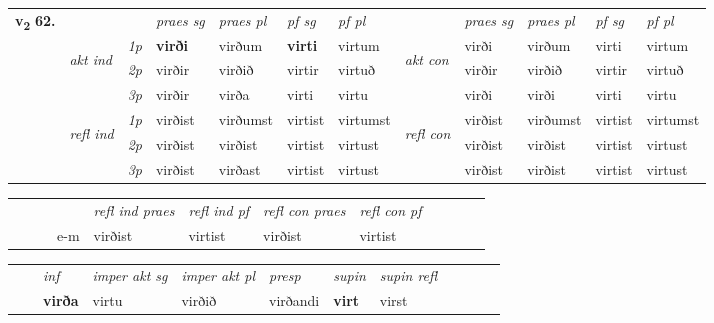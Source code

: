 \begin{tabular}{llllllllllll} \toprule
\multirow{4}{*}{{{\textbf{v{\textsubscript{2}}} \Large{\textbf{62.}}}}}  & &   &  \textit{praes sg}  & \textit{praes pl}  &\textit{ pf sg} & \textit{pf pl} &  &  \textit{praes sg}  & \textit{praes pl}  & \textit{pf sg} & \textit{pf pl } \\*
	\cmidrule{4-7} \cmidrule{9-12}
 & \multirow{3}{*}{\begin{turn}{90}\textit{akt ind}\end{turn}} & {\textit{1p}} & \textbf{virði} & virðum    & \textbf{virti} & virtum & \multirow{3}{*}{\begin{turn}{90}\textit{akt con}\end{turn}} &virði & virðum & virti & virtum\\*
& &  {\textit{2p}} &  virðir  & virðið   & virtir & virtuð & & virðir & virðið & virtir & virtuð \\*
& &  {\textit{3p}} & virðir & virða   & virti & virtu & & virði & virði& virti & virtu  \\*
\cmidrule{4-7} \cmidrule{9-12}
 &\multirow{3}{*}{\begin{turn}{90}\textit{refl ind}\end{turn}} & {\textit{1p}} & virðist & virðumst    & virtist & virtumst & \multirow{3}{*}{\begin{turn}{90}\textit{refl con}\end{turn}}  &virðist & virðumst & virtist & virtumst\\*
 &&  {\textit{2p}} &  virðist  & virðist   & virtist & virtust & &virðist & virðist & virtist & virtust \\*
& &  {\textit{3p}} & virðist & virðast   & virtist & virtust & & virðist & virðist& virtist & virtust  \\*
\cmidrule{4-7} \cmidrule{9-12}
\end{tabular}


\begin{tabular}{llllllllllll}
 & &  & &  \textit{refl ind praes} & \textit{refl ind pf} & \textit{refl con praes} & \textit{refl con pf} \\*
&  & & e-m & virðist & virtist & virðist & virtist \\*
\cmidrule{5-9}
\end{tabular}


\begin{tabular}{llllllllllll}
 & & \textit{inf} & \textit{imper akt sg} & \textit{imper akt pl}   & \textit{presp} & \textit{supin} & \textit{supin refl}      \\*
  & & \textbf{virða} & virtu  & virðið   & virðandi &  \textbf{virt} & virst  \\*
\cmidrule{1-12}
\end{tabular}



